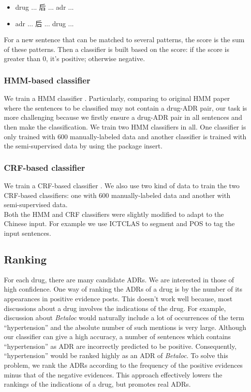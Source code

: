 \begin{itemize}
	\item drug ... 后 ... adr ... 
	\item adr ... 后 ... drug ... 
\end{itemize}

For a new sentence that can be matched to several patterns, the score is the sum of these patterns. Then a classifier is built based on the score: if the score is greater than 0, it’s positive; otherwise negative.

\subsubsection{HMM-based classifier}
\label{subsubsec:2.4.2}
We train a HMM classifier \citep{sampathkumar2014mining}. Particularly, comparing to original HMM paper where the sentences to be classified may not contain a drug-ADR pair, our task is more challenging because we firstly ensure a drug-ADR pair in all sentences and then make the classification.
We train two HMM classifiers in all. One classifier is only trained with 600 manually-labeled data and another classifier is trained with the semi-supervised data by using the package insert.

\subsubsection{CRF-based classifier}
\label{subsubsec:2.4.3}
We train a CRF-based classifier \citep{nikfarjam2015pharmacovigilance}. We also use two kind of data to train the two CRF-based classifiers: one with 600 manually-labeled data and another with semi-supervised data.
\\

Both the HMM and CRF classifiers were slightly modified to adapt to the Chinese input. For example we use ICTCLAS to segment and POS to tag the input sentences. 

\subsection{Ranking}
\label{subsec:2.5}
For each drug, there are many candidate ADRs. We are interested in those of high confidence. 
One way of ranking the ADRs of a drug is by the number of its appearances in positive 
evidence posts. This doesn’t work well because, most discussions about a drug involves the 
indications of the drug. For example, discussion about \textit{Betaloc} would naturally 
include a lot of occurrences of the term ``hypertension'' and the absolute number of such 
mentions is very large. Although our classifier can give a high accuracy, 
a number of sentences which contains ``hypertension'' as ADR are incorrectly predicted to 
be positive. Consequently, ``hypertension'' would be ranked highly as an ADR of 
\textit{Betaloc}. To solve this problem, we rank the ADRs according to the frequency of 
the positive evidences minus that of the negative evidences. This approach effectively 
lowers the rankings of the indications of a drug, but promotes real ADRs.
